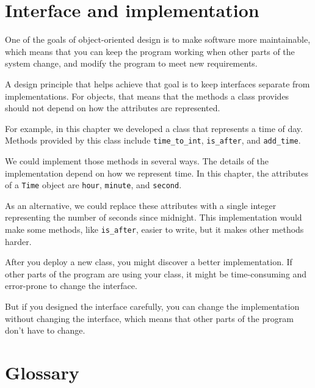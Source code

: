 \documentclass[10pt]{book}
\begin{document}
\section{Interface and implementation}

One of the goals of object-oriented design is to make software more
maintainable, which means that you can keep the program working when
other parts of the system change, and modify the program to meet new
requirements.

A design principle that helps achieve that goal is to keep
interfaces separate from implementations.  For objects, that means
that the methods a class provides should not depend on how the
attributes are represented.

For example, in this chapter we developed a class that represents
a time of day.  Methods provided by this class include
\verb"time_to_int", \verb"is_after", and \verb"add_time".

We could implement those methods in several ways.  The details of the
implementation depend on how we represent time.  In this chapter, the
attributes of a {\tt Time} object are {\tt hour}, {\tt minute}, and
{\tt second}.

As an alternative, we could replace these attributes with
a single integer representing the number of seconds
since midnight.  This implementation would make some methods,
like \verb"is_after", easier to write, but it makes other methods
harder.

After you deploy a new class, you might discover a better
implementation.  If other parts of the program are using your
class, it might be time-consuming and error-prone to change the
interface.  

But if you designed the interface carefully, you can
change the implementation without changing the interface, which
means that other parts of the program don't have to change.


\section{Glossary}
\end{document}
